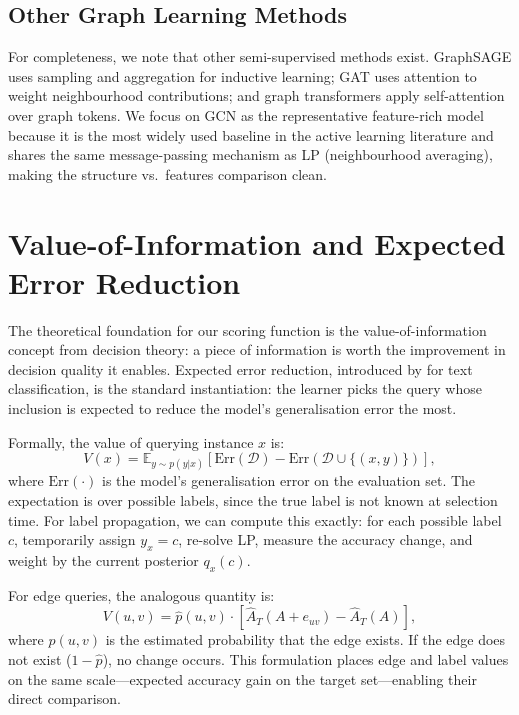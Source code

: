 \documentclass[12pt,a4paper,oneside]{report}
\begin{document}
\subsection{Other Graph Learning Methods}

For completeness, we note that other semi-supervised methods exist. GraphSAGE \citep{graphsage} uses sampling and aggregation for inductive learning; GAT \citep{gat} uses attention to weight neighbourhood contributions; and graph transformers apply self-attention over graph tokens. We focus on GCN as the representative feature-rich model because it is the most widely used baseline in the active learning literature and shares the same message-passing mechanism as LP (neighbourhood averaging), making the structure vs.\ features comparison clean.

\section{Value-of-Information and Expected Error Reduction}

The theoretical foundation for our scoring function is the value-of-information concept from decision theory: a piece of information is worth the improvement in decision quality it enables. Expected error reduction, introduced by \citet{roy} for text classification, is the standard instantiation: the learner picks the query whose inclusion is expected to reduce the model's generalisation error the most.

Formally, the value of querying instance $x$ is:
\begin{equation}
    V(x) = \mathbb{E}_{y \sim p(y|x)} \left[ \text{Err}(\mathcal{D}) - \text{Err}(\mathcal{D} \cup \{(x,y)\}) \right],
\end{equation}
where $\text{Err}(\cdot)$ is the model's generalisation error on the evaluation set. The expectation is over possible labels, since the true label is not known at selection time. For label propagation, we can compute this exactly: for each possible label $c$, temporarily assign $y_x = c$, re-solve LP, measure the accuracy change, and weight by the current posterior $q_x(c)$.

For edge queries, the analogous quantity is:
\begin{equation}
    V(u,v) = \hat{p}(u,v) \cdot \left[ \hat{A}_T(A + e_{uv}) - \hat{A}_T(A) \right],
\end{equation}
where $\hat{p}(u,v)$ is the estimated probability that the edge exists. If the edge does not exist ($1 - \hat{p}$), no change occurs. This formulation places edge and label values on the same scale---expected accuracy gain on the target set---enabling their direct comparison.
\end{document}
